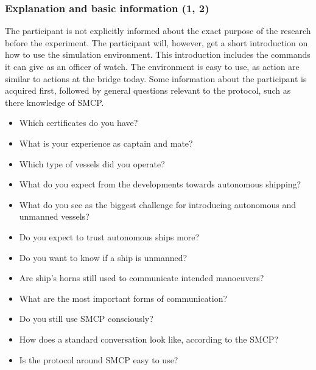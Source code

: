 \subsubsection{Explanation and basic information (1, 2)}
The participant is not explicitly informed about the exact purpose of the research before the experiment. The participant will, however, get a short introduction on how to use the simulation environment. This introduction includes the commands it can give as an officer of watch. The environment is easy to use, as action are similar to actions at the bridge today. Some information about the participant is acquired first, followed by general questions relevant to the protocol, such as there knowledge of \acf{SMCP}.
\begin{spacing}{.9}
	\begin{itemize}
		\item Which certificates do you have? \participant
		\item What is your experience as captain and mate? \participant
		\item Which type of vessels did you operate? \participant
		\item What do you expect from the developments towards autonomous shipping? \participant \protocol
		\item What do you see as the biggest challenge for introducing autonomous and unmanned vessels? \participant \protocol
		\item Do you expect to trust autonomous ships more? \participant \trust
		\item Do you want to know if a ship is unmanned? \trust
		\item Are ship's horns still used to communicate intended manoeuvers? \protocol
		\item What are the most important forms of communication? \protocol
		\item Do you still use \ac{SMCP} consciously? \participant
		\item How does a standard conversation look like, according to the \ac{SMCP}? \participant \protocol
		\item Is the protocol around \ac{SMCP} easy to use? \protocol
	\end{itemize}
\end{spacing}

